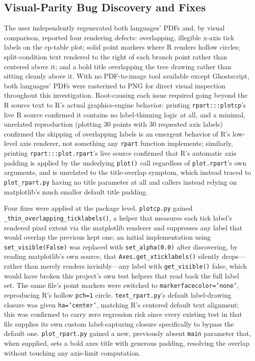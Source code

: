 \documentclass[12pt]{article}
\begin{document}
\subsection{Visual-Parity Bug Discovery and Fixes}

The user independently regenerated both languages' PDFs and, by visual comparison, reported four rendering defects: overlapping, illegible x-axis tick labels on the cp-table plot; solid point markers where R renders hollow circles; split-condition text rendered to the right of each branch point rather than centered above it; and a bold title overlapping the tree drawing rather than sitting cleanly above it. With no PDF-to-image tool available except Ghostscript, both languages' PDFs were rasterized to PNG for direct visual inspection throughout this investigation. Root-causing each issue required going beyond the R source text to R's actual graphics-engine behavior: printing \texttt{rpart:::plotcp}'s live R source confirmed it contains no label-thinning logic at all, and a minimal, unrelated reproduction (plotting 30 points with 30 requested axis labels) confirmed the skipping of overlapping labels is an emergent behavior of R's low-level axis renderer, not something any \texttt{rpart} function implements; similarly, printing \texttt{rpart:::plot.rpart}'s live source confirmed that R's automatic axis padding is applied by the underlying \texttt{plot()} call regardless of \texttt{plot.rpart}'s own arguments, and is unrelated to the title-overlap symptom, which instead traced to \texttt{plot\_rpart.py} having no title parameter at all and callers instead relying on matplotlib's much smaller default title padding.

Four fixes were applied at the package level. \texttt{plotcp.py} gained \texttt{\_thin\_overlapping\_ticklabels()}, a helper that measures each tick label's rendered pixel extent via the matplotlib renderer and suppresses any label that would overlap the previous kept one; an initial implementation using \texttt{set\_visible(False)} was replaced with \texttt{set\_alpha(0.0)} after discovering, by reading matplotlib's own source, that \texttt{Axes.get\_xticklabels()} silently drops---rather than merely renders invisibly---any label with \texttt{get\_visible()} false, which would have broken this project's own test helpers that read back the full label set. The same file's point markers were switched to \texttt{markerfacecolor='none'}, reproducing R's hollow \texttt{pch=1} circle. \texttt{text\_rpart.py}'s default label-drawing closure was given \texttt{ha='center'}, matching R's centered default text alignment; this was confirmed to carry zero regression risk since every existing test in that file supplies its own custom label-capturing closure specifically to bypass the default one. \texttt{plot\_rpart.py} gained a new, previously absent \texttt{main} parameter that, when supplied, sets a bold axes title with generous padding, resolving the overlap without touching any axis-limit computation.
\end{document}
